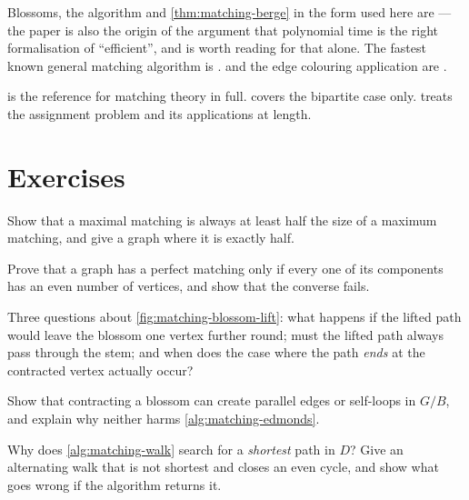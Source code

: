 Blossoms, the algorithm and \cref{thm:matching-berge} in the form used here are
\citet{Edmonds1965} --- the paper is also the origin of the argument that
polynomial time is the right formalisation of ``efficient'', and is worth
reading for that alone. The fastest known general matching algorithm is
\citet{MicaliVazirani1980}.  and the edge colouring
application are \citet{Schrijver1999}.

\citet[Chapters 16, 17 and 24]{Schrijver2003} is the reference for matching
theory in full. \citet[Chapters 24 and 25]{CLRS2022} covers the bipartite case
only. \citet{AhujaMagnantiOrlin1993} treats the assignment problem and its
applications at length.

\section{Exercises}
\label{sec:ex-matching}

\begin{exercise}
Show that a maximal matching is always at least half the size of a maximum
matching, and give a graph where it is exactly half.
\end{exercise}

\begin{exercise}
Prove that a graph has a perfect matching only if every one of its components
has an even number of vertices, and show that the converse fails.
\end{exercise}

\begin{exercise}
Three questions about
\cref{fig:matching-blossom-lift}: what happens if the lifted path would leave
the blossom one vertex further round; must the lifted path always pass through
the stem; and when does the case where the path \emph{ends} at the contracted
vertex actually occur?
\end{exercise}

\begin{exercise}
Show that contracting a blossom can create parallel edges or self-loops in
$G/B$, and explain why neither harms \cref{alg:matching-edmonds}.
\end{exercise}

\begin{exercise}
Why does \cref{alg:matching-walk} search for a \emph{shortest} path in $D$?
Give an alternating walk that is not shortest and closes an even cycle, and show
what goes wrong if the algorithm returns it.
\end{exercise}

